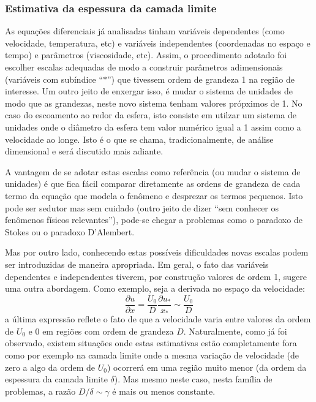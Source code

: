 \subsubsection{Estimativa da espessura da camada limite}
As equações diferenciais já analisadas tinham variáveis dependentes (como velocidade, temperatura, etc) e variáveis independentes (coordenadas no espaço e tempo) e parâmetros (viscosidade, etc). Assim, o procedimento adotado foi escolher escalas adequadas de modo a construir parâmetros adimensionais (variáveis com subíndice ``$*$'') que tivessem ordem de grandeza 1 na região de interesse. Um outro jeito de enxergar isso, é mudar o sistema de unidades de modo que as grandezas, neste novo sistema tenham valores própximos de 1. No caso do escoamento ao redor da esfera, isto consiste em utilzar um sistema de unidades onde o diâmetro da esfera tem valor numérico igual a 1 assim como a velocidade ao longe. Isto é o que se chama, tradicionalmente, de análise dimensional e será discutido mais adiante. 

A vantagem de se adotar estas escalas como referência (ou mudar o sistema de unidades) é que fica fácil comparar diretamente as ordens de grandeza de cada termo da equação que modela o fenômeno e desprezar  os termos pequenos. Isto pode ser sedutor mas sem cuidado (outro jeito de dizer ``sem conhecer os fenômenos físicos relevantes''), pode-se chegar a problemas como o paradoxo de Stokes ou o paradoxo D'Alembert. 

Mas por outro lado, conhecendo estas possíveis dificuldades novas escalas podem ser introduzidas de maneira apropriada. Em geral, o fato das variáveis dependentes e independentes tiverem, por construção valores de ordem 1, sugere uma outra abordagem. Como exemplo, seja a derivada no espaço da velocidade:
\[
\frac{\partial u}{\partial x} = \frac{U_0}{D}\frac{\partial u_*}{x_*} \sim \frac{U_0}{D}
\]
a última expressão reflete o fato de que a velocidade varia entre valores da ordem de $U_0$ e $0$ em regiões com ordem de grandeza $D$. Naturalmente, como já foi observado,  existem situações onde estas estimativas estão completamente fora como por exemplo na camada limite onde a mesma variação de velocidade (de zero a algo da ordem de $U_0$) ocorrerá em uma região muito menor (da ordem da espessura da camada limite $\delta$). Mas mesmo neste caso, nesta família de problemas, a razão $D/\delta\sim\gamma$ é mais ou menos constante. 

